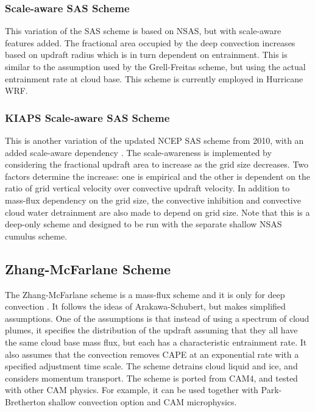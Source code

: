 \subsubsection{Scale-aware SAS Scheme}

This variation of the SAS scheme is based on NSAS, but with scale-aware features added. 
The fractional area occupied by the deep convection increases based on updraft radius 
which is in turn dependent on entrainment. This is similar to the assumption used by 
the Grell-Freitas scheme, but using the actual entrainment rate at cloud base. This scheme 
is currently employed in Hurricane WRF.

\subsubsection{KIAPS Scale-aware SAS Scheme}

This is another variation of the updated NCEP SAS scheme from 2010, 
with an added scale-aware dependency \citep{kwon17}. The scale-awareness is implemented by considering 
the fractional updraft area to increase as the grid size decreases. Two factors determine 
the increase: one is empirical and the other is dependent on the ratio of grid vertical 
velocity over convective updraft velocity. In addition to mass-flux dependency on the grid size, 
the convective inhibition and convective cloud water detrainment are also made to depend on grid size.
Note that this is a deep-only scheme and designed to be run with the separate shallow
NSAS cumulus scheme.

\subsection{Zhang-McFarlane Scheme}

The Zhang-McFarlane scheme is a mass-flux scheme and it is only for deep convection \citep{zhang95}. 
It follows the ideas of Arakawa-Schubert, but makes simplified 
assumptions. One of the assumptions is that instead of using a spectrum of cloud plumes, 
it specifies the distribution of the updraft assuming that they all have the same cloud 
base mass flux, but each has a characteristic entrainment rate. It also assumes that the 
convection removes CAPE at an exponential rate with a specified adjustment time scale. 
The scheme detrains cloud liquid and ice, and considers momentum transport. The scheme 
is ported from CAM4, and tested with other CAM physics. For example, it can be 
used together with Park-Bretherton shallow convection option and CAM microphysics.

